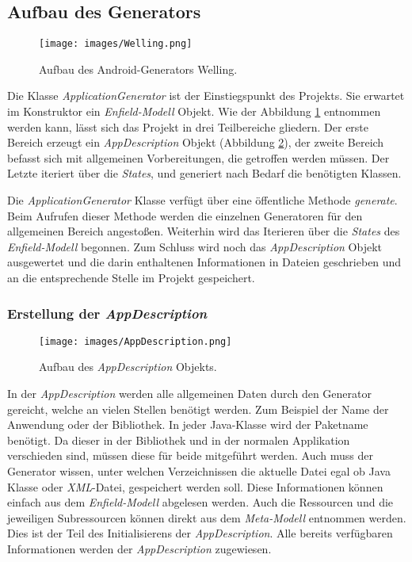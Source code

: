 \subsection{Aufbau des Generators}

\begin{figure}[H]
	\begin{center}
		\texttt{[image: images/Welling.png]}
		\caption{Aufbau des Android-Generators Welling.}
		\label{fig:welling}
	\end{center}
\end{figure}


Die Klasse \textit{ApplicationGenerator} ist der Einstiegspunkt des Projekts. Sie erwartet im Konstruktor ein \textit{Enfield-Modell} Objekt. Wie der Abbildung \ref{fig:welling} entnommen werden kann, lässt sich das Projekt in drei Teilbereiche gliedern. Der erste Bereich erzeugt ein \textit{AppDescription} Objekt (Abbildung \ref{fig:appDescription}), der zweite Bereich befasst sich mit allgemeinen Vorbereitungen, die getroffen werden müssen. Der Letzte iteriert über die \textit{States}, und generiert nach Bedarf die benötigten Klassen.

Die \textit{ApplicationGenerator} Klasse verfügt über eine öffentliche Methode \textit{generate}. Beim Aufrufen dieser Methode werden die einzelnen Generatoren für den allgemeinen Bereich angestoßen. Weiterhin wird das Iterieren über die \textit{States} des \textit{Enfield-Modell} begonnen. Zum Schluss wird noch das \textit{AppDescription} Objekt ausgewertet und die darin enthaltenen Informationen in Dateien geschrieben und an die entsprechende Stelle im Projekt gespeichert.

\subsubsection{Erstellung der \textit{AppDescription}}

\begin{figure}[H]
	\begin{center}
		\texttt{[image: images/AppDescription.png]}
		\caption{Aufbau des \textit{AppDescription} Objekts.}
		\label{fig:appDescription}
	\end{center}
\end{figure}

In der \textit{AppDescription} werden alle allgemeinen Daten durch den Generator gereicht, welche an vielen Stellen benötigt werden. 
Zum Beispiel der Name der Anwendung oder der Bibliothek. In jeder Java-Klasse wird der Paketname benötigt. Da dieser in der Bibliothek und in der normalen Applikation verschieden sind, müssen diese für beide mitgeführt werden. Auch muss der Generator wissen, unter welchen Verzeichnissen die aktuelle Datei egal ob Java Klasse oder \textit{XML}-Datei, gespeichert werden soll. 
Diese Informationen können einfach aus dem \textit{Enfield-Modell} abgelesen werden. Auch die Ressourcen und die jeweiligen Subressourcen können direkt aus dem \textit{Meta-Modell} entnommen werden.  Dies ist der Teil des Initialisierens der \textit{AppDescription}. Alle bereits verfügbaren Informationen werden der \textit{AppDescription} zugewiesen. 

